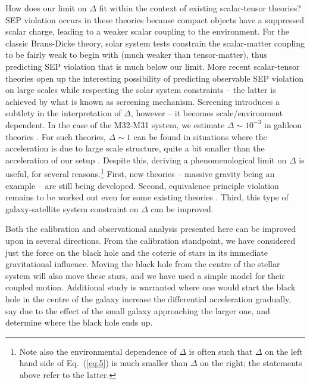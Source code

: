 \documentclass[useAMS,usenatbib]{mn2e}
\begin{document}
How does our limit on $\Delta$ fit within the context of existing
scalar-tensor theories? SEP violation occurs in these theories because
compact objects have a suppressed scalar charge, leading to a weaker
scalar coupling to the environment. For the classic Brans-Dicke
theory, solar system tests constrain the scalar-matter coupling to be
fairly weak to begin with (much weaker than tensor-matter), thus
predicting SEP violation that is much below our limit.  More recent
scalar-tensor theories open up the interesting possibility of
predicting observable SEP violation on large scales while respecting
the solar system constraints -- the latter is achieved by what is
known as screening mechanism. Screening introduces a subtlety in the
interpretation of $\Delta$, however -- it becomes scale/environment
dependent. In the case of the M32-M31 system, we estimate $\Delta \sim
10^{-3}$ in galileon theories \citep{2009PhRvD..79f4036N}.  For such
theories, $\Delta \sim 1$ can be found in situations where the
acceleration is due to large scale structure, quite a bit smaller than
the acceleration of our setup \citep{2012PhRvL.109e1304H}.  Despite
this, deriving a phenomenological limit on $\Delta$ is useful, for
several reasons.\footnote{Note also the environmental dependence of
  $\Delta$ is often such that $\Delta$ on the left hand side of Eq.~(\ref{eq:5})
  is much smaller than $\Delta$ on the right; the statements above
  refer to the latter.}  First, new theories -- massive gravity being
an example -- are still being developed. Second, equivalence principle
violation remains to be worked out even for some existing theories
\citep{2009PhRvD..80j4002H}.  Third, this type of galaxy-satellite
system constraint on $\Delta$ can be improved.

Both the calibration and observational analysis presented here can be
improved upon in several directions.  From the calibration standpoint,
we have 
considered
just the force on the black hole and the coterie
of stars in its immediate gravitational influence.  Moving the black
hole from the centre of the stellar system will also move these stars,
and we have used a simple model for their coupled motion.
Additional study is warranted where one would start the black hole
in the centre of the galaxy increase the differential acceleration gradually,
say due to the effect of the small galaxy 
approaching 
the larger one, and determine where the black hole ends up.
\end{document}
